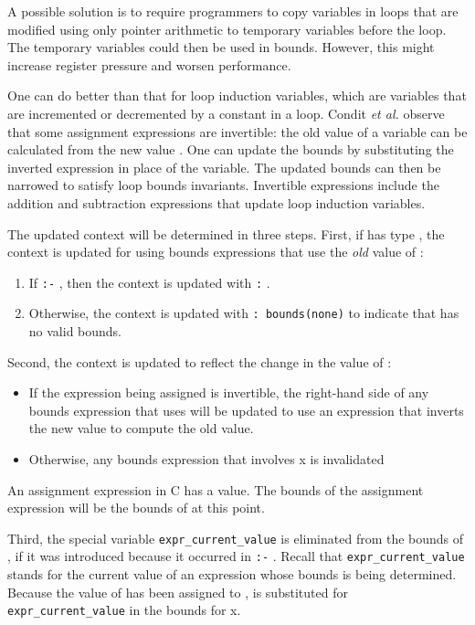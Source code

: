 A possible solution is to require programmers to copy variables in loops
that are modified using only pointer arithmetic to temporary variables
before the loop. The temporary variables could then be used in bounds.
However, this might increase register pressure and worsen performance.

One can do better than that for loop induction variables, which are
variables that are incremented or decremented by a constant in a loop.
Condit \textit{et al.} observe that some assignment expressions are
invertible: the old value of a variable can be calculated from the new
value . One can update the bounds by substituting the inverted
expression in place of the variable. The updated bounds can then be
narrowed to satisfy loop bounds invariants. Invertible expressions
include the addition and subtraction expressions that update loop
induction variables.

The updated context will be determined in three steps. First, if
 has type \arrayptr, the context is updated for
 using bounds expressions that use the \emph{old} value of :

\begin{enumerate}
\item
  If  \texttt{:-} , then the context is updated with
   \texttt{:} .
\item
  Otherwise, the context is updated with  \texttt{:
  bounds(none)} to indicate that  has no valid bounds.
\end{enumerate}

Second, the context is updated to reflect the change in the value of
:

\begin{itemize}
\item
  If the expression being assigned is invertible, the right-hand side of
  any bounds expression that uses  will be updated to use an
  expression that inverts the new value to compute the old value.
\item
  Otherwise, any bounds expression that involves x is invalidated
\end{itemize}

An assignment expression in C has a value. The bounds of the assignment
expression will be the bounds of  at this point.

Third, the special variable \texttt{expr\_current\_value} is eliminated
from the bounds of , if it was introduced because it occurred in
 \texttt{:-} . Recall that
\texttt{expr\_current\_value} stands for the current value of an
expression whose bounds is being determined. Because the value of
 has been assigned to ,  is substituted for
\texttt{expr\_current\_value} in the bounds for x.

